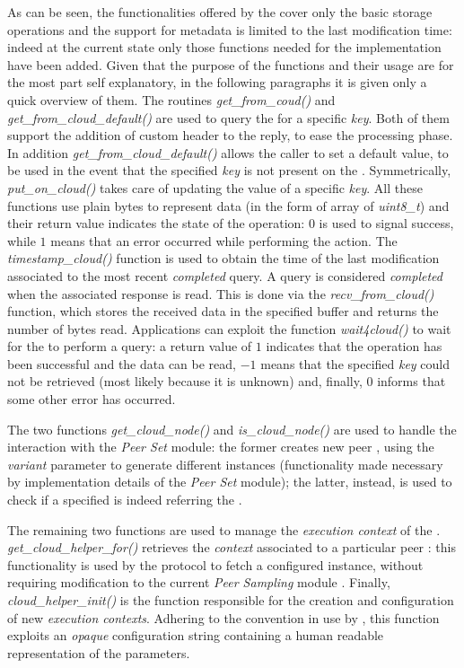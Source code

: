 As can be seen, the functionalities offered by the \api cover only the
basic storage \cloud operations and the support for metadata is limited to the
last modification time: indeed at the current state only those
functions needed for the \cloudcast implementation have been
added.
Given that the purpose of the functions and their usage are for the most
part self explanatory, in the following paragraphs it is given
only a quick overview of them.
The routines \emph{get\_from\_coud()} and
\emph{get\_from\_cloud\_default()} are used to
query the \cloud for a specific \emph{key}. Both of them support the
addition of custom header to the reply, to ease the processing
phase. In addition \emph{get\_from\_cloud\_default()} allows the caller to
set a default value, to be used in the event that the specified
\emph{key} is not present on the \cloud. Symmetrically,
\emph{put\_on\_cloud()} takes care of updating the value of a specific
\emph{key}. All these functions use plain bytes to represent
data (in the form of array of \emph{uint8\_t}) and their return
value indicates the state of the operation: $0$ is used to signal
success, while $1$ means that an error occurred while performing the
action. The \emph{timestamp\_cloud()} function is used to obtain the time
of the last modification associated to the most recent
\emph{completed} query. A query is considered \emph{completed}
when the associated response is read. This is done via the
\emph{recv\_from\_cloud()} function, which stores the received data in the
specified buffer and returns the number of bytes read. Applications can
exploit the function \emph{wait4cloud()} to wait for the \cloud to
perform a query: a return value of $1$ indicates that the
operation has been successful and the data can be read, $-1$ means that the
specified \emph{key} could not be retrieved (most likely because it is
unknown) and, finally, $0$ informs that some other error has occurred.

The two functions \emph{get\_cloud\_node()} and \emph{is\_cloud\_node()} are used
to handle the interaction with the \textit{Peer Set} module: the
former creates new peer \descriptors, using the \emph{variant}
parameter to generate different instances (functionality made
necessary by implementation details of the \textit{Peer Set} module);
the latter, instead, is used to check if a specified \descriptor is
indeed referring the \cloud.

The remaining two functions are used to manage the \textit{execution
  context} of the \cloudhelper. \textit{get\_cloud\_helper\_for()} retrieves the
\emph{context} associated to a particular peer \descriptor: this
functionality is used by the \cloudcast \peersampling protocol to
fetch a configured \cloudhelper instance, without requiring
modification to the current \grapes \textit{Peer Sampling} module
\api. Finally, \textit{cloud\_helper\_init()} is the function
responsible for the
creation and configuration of new \cloudhelper \textit{execution
  contexts}. Adhering to the convention in use by \grapes, this function
exploits an \textit{opaque} configuration string containing a
human readable representation of the parameters.

